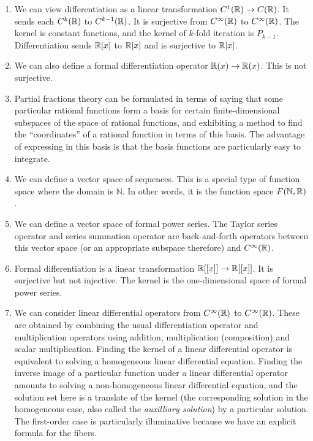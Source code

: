 \documentclass[10pt]{amsart}
\begin{document}
\begin{enumerate}
\item We can view differentiation as a linear transformation $C^1(\mathbb{R})
  \to C(\mathbb{R})$. It sends each $C^k(\mathbb{R})$ to $C^{k-1}(\mathbb{R})$. It is
  surjective from $C^\infty(\mathbb{R})$ to $C^\infty(\mathbb{R})$. The kernel is
  constant functions, and the kernel of $k$-fold iteration is
  $P_{k-1}$. Differentiation sends $\mathbb{R}[x]$ to $\mathbb{R}[x]$ and is
  surjective to $\mathbb{R}[x]$.
\item We can also define a formal differentiation operator $\mathbb{R}(x) \to
  \mathbb{R}(x)$. This is not surjective.
\item Partial fractions theory can be formulated in terms of saying
  that some particular rational functions form a basis for certain
  finite-dimensional subspaces of the space of rational functions, and
  exhibiting a method to find the ``coordinates'' of a rational
  function in terms of this basis. The advantage of expressing in this
  basis is that the basis functions are particularly easy to integrate.
\item We can define a vector space of sequences. This is a special
  type of function space where the domain is $\mathbb{N}$. In other
  words, it is the function space $F(\mathbb{N},\mathbb{R})$.
\item We can define a vector space of formal power series. The Taylor
  series operator and series summation operator are back-and-forth
  operators between this vector space (or an appropriate subspace
  therefore) and $C^\infty(\mathbb{R})$.
\item Formal differentiation is a linear transformation $\mathbb{R}[[x]] \to
  \mathbb{R}[[x]]$. It is surjective but not injective. The kernel is the
  one-dimensional space of formal power series.
\item We can consider linear differential operators from
  $C^\infty(\mathbb{R})$ to $C^\infty(\mathbb{R})$. These are obtained by combining
  the usual differentiation operator and multiplication operators
  using addition, multiplication (composition) and scalar
  multiplication. Finding the kernel of a linear differential operator
  is equivalent to solving a homogeneous linear differential
  equation. Finding the inverse image of a particular function under a
  linear differential operator amounts to solving a non-homogeneous
  linear differential equation, and the solution set here is a
  translate of the kernel (the corresponding solution in the
  homogeneous case, also called the {\em auxilliary solution}) by a
  particular solution. The first-order case is particularly
  illuminative because we have an explicit formula for the fibers.
\end{enumerate}
\end{document}
